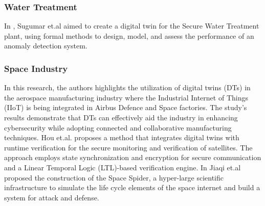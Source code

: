 \subsubsection{Water Treatment}
In \cite{sugumarAssessmentMethodDetecting2019}, Sugumar et.al aimed to create a digital twin for the Secure Water Treatment plant, using formal methods to design, model, and assess the performance of an anomaly detection system.
\subsubsection{Space Industry}

In \cite{adrienbacueDigitalTwinsEnhanced2022} this research, the authors highlights the utilization of digital twins (DTs) in the aerospace manufacturing industry where the Industrial Internet of Things (IIoT) is being integrated in Airbus Defence and Space factories. The study's results demonstrate that DTs can effectively aid the industry in enhancing cybersecurity while adopting connected and collaborative manufacturing techniques.
Hou et.al. \cite{houDigitalTwinRuntime2022} proposes a method that integrates digital twins with runtime verification for the secure monitoring and verification of satellites. The approach employs state synchronization and encryption for secure communication and a Linear Temporal Logic (LTL)-based verification engine.
In \cite{jiaqiliSpaceSpiderHyper2022} Jiaqi et.al proposed the construction of the Space Spider, a hyper-large scientific infrastructure to simulate the life cycle elements of the space internet and build a system for attack and defense.
